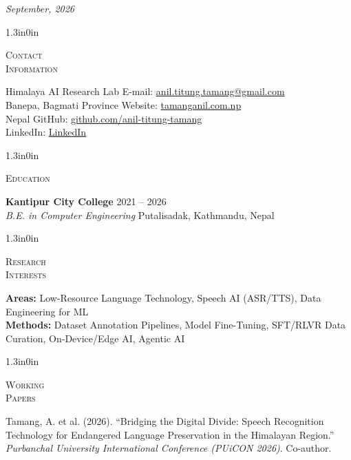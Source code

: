 \documentclass[11pt]{article}
\newcommand{\cvlabel}[1]{\hspace*{-1.3in}\parbox[t][\baselineskip][t]{1.05in}{\raggedright\scshape #1\par}\hspace{0.25in}}
\newenvironment{cvsection}[1]{%
  \begin{adjustwidth}{1.3in}{0in}\noindent\cvlabel{#1}%
}{%
  \end{adjustwidth}\vspace{10pt}
}
\begin{document}
 \hfill {\itshape September, 2026}
\vspace{12pt}
\par

\begin{cvsection}{Contact\\Information}
Himalaya AI Research Lab \hfill E-mail: \href{mailto:anil.titung.tamang@gmail.com}{anil.titung.tamang@gmail.com} \\
Banepa, Bagmati Province \hfill Website: \href{https://tamanganil.com.np}{tamanganil.com.np} \\
Nepal \hfill GitHub: \href{https://github.com/anil-titung-tamang}{github.com/anil-titung-tamang} \\
\hfill LinkedIn: \href{https://www.linkedin.com/in/anil-titung-tamang/}{LinkedIn}
\end{cvsection}

\begin{cvsection}{Education}
\textbf{Kantipur City College} \hfill 2021 -- 2026 \\
\textit{B.E. in Computer Engineering} \hfill Putalisadak, Kathmandu, Nepal
\end{cvsection}

\begin{cvsection}{Research\\Interests}
\textbf{Areas:} Low-Resource Language Technology, Speech AI (ASR/TTS), Data Engineering for ML \\
\textbf{Methods:} Dataset Annotation Pipelines, Model Fine-Tuning, SFT/RLVR Data Curation, On-Device/Edge AI, Agentic AI
\end{cvsection}

\begin{cvsection}{Working\\Papers}
Tamang, A. et al. (2026). ``Bridging the Digital Divide: Speech Recognition Technology for Endangered Language Preservation in the Himalayan Region.'' \textit{Purbanchal University International Conference (PUiCON 2026)}. Co-author.
\end{cvsection}
\end{document}
